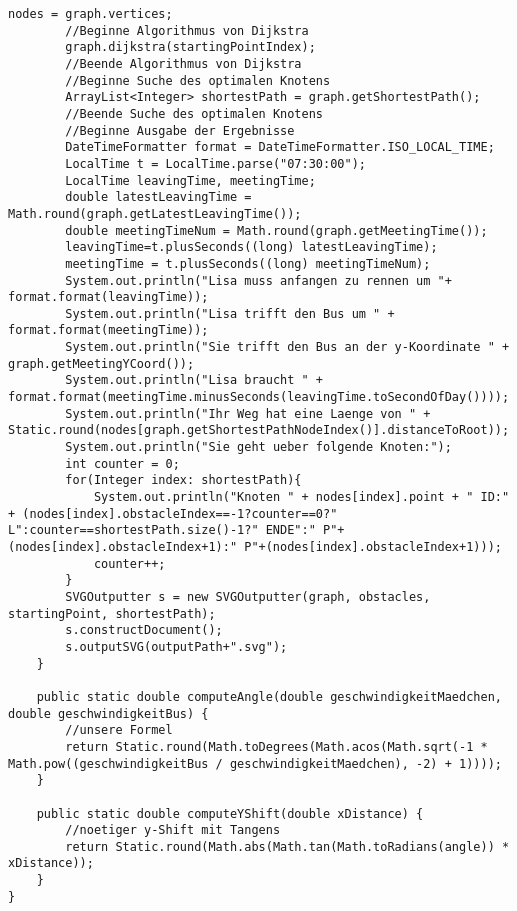 \documentclass[a4paper,10pt,ngerman]{scrartcl}
\begin{document}
\begin{lstlisting}[frame=single]
		nodes = graph.vertices;
        //Beginne Algorithmus von Dijkstra
        graph.dijkstra(startingPointIndex);
        //Beende Algorithmus von Dijkstra
        //Beginne Suche des optimalen Knotens
        ArrayList<Integer> shortestPath = graph.getShortestPath();
        //Beende Suche des optimalen Knotens
        //Beginne Ausgabe der Ergebnisse
        DateTimeFormatter format = DateTimeFormatter.ISO_LOCAL_TIME;
        LocalTime t = LocalTime.parse("07:30:00");
        LocalTime leavingTime, meetingTime;
        double latestLeavingTime = Math.round(graph.getLatestLeavingTime());
        double meetingTimeNum = Math.round(graph.getMeetingTime());
        leavingTime=t.plusSeconds((long) latestLeavingTime);
        meetingTime = t.plusSeconds((long) meetingTimeNum);
        System.out.println("Lisa muss anfangen zu rennen um "+ format.format(leavingTime));
        System.out.println("Lisa trifft den Bus um " + format.format(meetingTime));
        System.out.println("Sie trifft den Bus an der y-Koordinate " + graph.getMeetingYCoord());
        System.out.println("Lisa braucht " + format.format(meetingTime.minusSeconds(leavingTime.toSecondOfDay())));
        System.out.println("Ihr Weg hat eine Laenge von " + Static.round(nodes[graph.getShortestPathNodeIndex()].distanceToRoot));
        System.out.println("Sie geht ueber folgende Knoten:");
        int counter = 0;
        for(Integer index: shortestPath){
            System.out.println("Knoten " + nodes[index].point + " ID:" + (nodes[index].obstacleIndex==-1?counter==0?" L":counter==shortestPath.size()-1?" ENDE":" P"+(nodes[index].obstacleIndex+1):" P"+(nodes[index].obstacleIndex+1)));
            counter++;
        }
        SVGOutputter s = new SVGOutputter(graph, obstacles, startingPoint, shortestPath);
        s.constructDocument();
        s.outputSVG(outputPath+".svg");
    }

    public static double computeAngle(double geschwindigkeitMaedchen, double geschwindigkeitBus) {
        //unsere Formel
        return Static.round(Math.toDegrees(Math.acos(Math.sqrt(-1 * Math.pow((geschwindigkeitBus / geschwindigkeitMaedchen), -2) + 1))));
    }

    public static double computeYShift(double xDistance) {
        //noetiger y-Shift mit Tangens
        return Static.round(Math.abs(Math.tan(Math.toRadians(angle)) * xDistance));
    }
}
\end{lstlisting}
\end{document}

